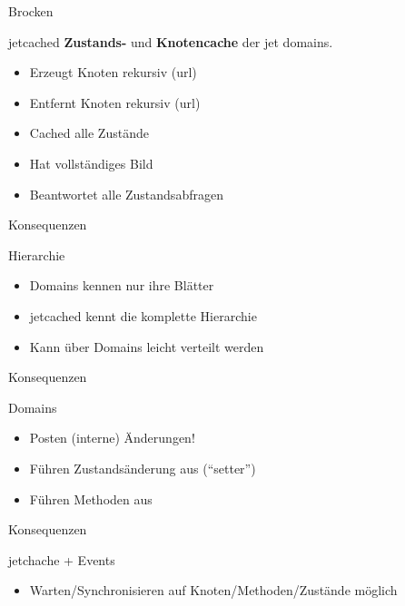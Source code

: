 \documentclass[xelatex,hyperref={pdfpagelabels=false}]{beamer}
\begin{document}
\begin{frame}[fragile]{Brocken}
\begin{block}{jetcached}
\textbf{Zustands-} und \textbf{Knotencache} der jet domains.
\begin{itemize}
  \item Erzeugt Knoten rekursiv (url)
  \item Entfernt Knoten rekursiv (url)
  \item Cached alle Zustände
  \item Hat vollständiges Bild
  \item Beantwortet alle Zustandsabfragen
\end{itemize}
\end{block}
\end{frame}


\begin{frame}[fragile]{Konsequenzen}
\begin{block}{Hierarchie}
  \begin{itemize}
  \item Domains kennen nur ihre Blätter
  \item jetcached kennt die komplette Hierarchie
  \item Kann über Domains leicht verteilt werden
  \end{itemize}
\end{block}
\end{frame}

\begin{frame}[fragile]{Konsequenzen}
\begin{block}{Domains}  
  \begin{itemize}
  \item Posten (interne) Änderungen!
  \item Führen Zustandsänderung aus (``setter'')
  \item Führen Methoden aus
  \end{itemize}
\end{block}
\end{frame}

\begin{frame}[fragile]{Konsequenzen}
\begin{block}{jetchache + Events}  
  \begin{itemize}
  \item Warten/Synchronisieren auf Knoten/Methoden/Zustände möglich
  \end{itemize}
\end{block}
\end{frame}
\end{document}
